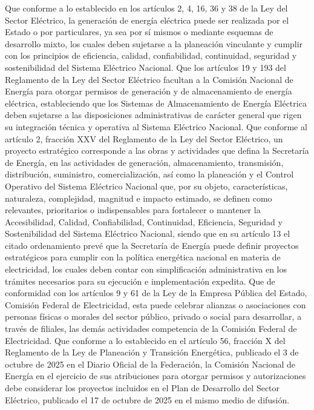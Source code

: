 Que conforme a lo establecido en los artículos 2, 4, 16, 36 y 38 de la Ley del Sector Eléctrico, la generación de energía eléctrica puede ser realizada por el Estado o por particulares, ya sea por sí mismos o mediante esquemas de desarrollo mixto, los cuales deben sujetarse a la planeación vinculante y cumplir con los principios de eficiencia, calidad, confiabilidad, continuidad, seguridad y sostenibilidad del Sistema Eléctrico Nacional.
Que los artículos 19 y 193 del Reglamento de la Ley del Sector Eléctrico facultan a la Comisión Nacional de Energía para otorgar permisos de generación y de almacenamiento de energía eléctrica, estableciendo que los Sistemas de Almacenamiento de Energía Eléctrica deben sujetarse a las disposiciones administrativas de carácter general que rigen su integración técnica y operativa al Sistema Eléctrico Nacional.
Que conforme al artículo 2, fracción XXV del Reglamento de la Ley del Sector Eléctrico, un proyecto estratégico corresponde a las obras y actividades que defina la Secretaría de Energía, en las actividades de generación, almacenamiento, transmisión, distribución, suministro, comercialización, así como la planeación y el Control Operativo del Sistema Eléctrico Nacional que, por su objeto, características, naturaleza, complejidad, magnitud e impacto estimado, se definen como relevantes, prioritarios o indispensables para fortalecer o mantener la Accesibilidad, Calidad, Confiabilidad, Continuidad, Eficiencia, Seguridad y Sostenibilidad del Sistema Eléctrico Nacional, siendo que en su artículo 13 el citado ordenamiento prevé que la Secretaría de Energía puede definir proyectos estratégicos para cumplir con la política energética nacional en materia de electricidad, los cuales deben contar con simplificación administrativa en los trámites necesarios para su ejecución e implementación expedita.
Que de conformidad con los artículos 9 y 61 de la Ley de la Empresa Pública del Estado, Comisión Federal de Electricidad, esta puede celebrar alianzas o asociaciones con personas físicas o morales del sector público, privado o social para desarrollar, a través de filiales, las demás actividades competencia de la Comisión Federal de Electricidad.
Que conforme a lo establecido en el artículo 56, fracción X del Reglamento de la Ley de Planeación y Transición Energética, publicado el 3 de octubre de 2025 en el Diario Oficial de la Federación, la Comisión Nacional de Energía en el ejercicio de sus atribuciones para otorgar permisos y autorizaciones debe considerar los proyectos incluidos en el Plan de Desarrollo del Sector Eléctrico, publicado el 17 de octubre de 2025 en el mismo medio de difusión.
